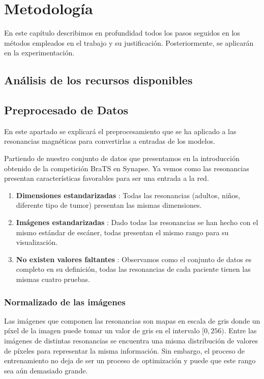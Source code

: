 \chapter{Metodología}

En este capítulo describimos en profundidad todos los pasos seguidos en los métodos empleados en el trabajo y su justificación. Posteriormente, se aplicarán en la experimentación.

\section{Análisis de los recursos disponibles}


\section{Preprocesado de Datos}

En este apartado se explicará el preprocesamiento que se ha aplicado a las resonancias magnéticas para convertirlas a entradas de los modelos. 


Partiendo de nuestro conjunto de datos que presentamos en la introducción obtenido de la competición BraTS en Synapse. Ya vemos como las resonancias presentan características favorables para ser una entrada a la red.

\begin{enumerate}
	\item \textbf{Dimensiones estandarizadas} : Todas las resonancias (adultos, niños, diferente tipo de tumor) presentan las mismas dimensiones.
	\item \textbf{Imágenes estandarizadas} : Dado todas las resonancias se han hecho con el mismo estándar de escáner, todas presentan el mismo rango para su visualización. 
	\item \textbf{No existen valores faltantes} : Observamos como el conjunto de datos es completo en su definición, todas las resonancias de cada paciente tienen las mismas cuatro pruebas.
\end{enumerate}

\subsection{Normalizado de las imágenes}

Las imágenes que componen las resonancias son mapas en escala de gris donde un píxel de la imagen puede tomar un valor de gris en el intervalo $[0, 256)$. Entre las imágenes de distintas resonancias se encuentra una misma distribución de valores de píxeles para representar la misma información. Sin embargo, el proceso de entrenamiento no deja de ser un proceso de optimización y puede que este rango sea aún demasiado grande.

